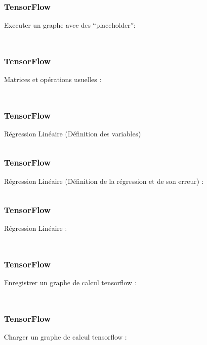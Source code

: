 \begin{frame}
  \frametitle{TensorFlow}
  Executer un graphe avec des ``placeholder'':
  \inputminted[linenos,fontsize=\small,bgcolor=pythonbg]{python}{code-illustration/tf-run_graph_placeholder.py}
  \inputminted[linenos,fontsize=\small,bgcolor=returnbg]{text}{code-illustration/tf-run_graph_placeholder.txt}
\end{frame}

\begin{frame}
  \frametitle{TensorFlow}
  Matrices et opérations usuelles :
  \inputminted[linenos,fontsize=\small,bgcolor=pythonbg]{python}{code-illustration/tf-matrices.py}
  \inputminted[linenos,fontsize=\small,bgcolor=returnbg]{text}{code-illustration/tf-matrices.txt}
\end{frame}

\begin{frame}
  \frametitle{TensorFlow}
  Régression Linéaire (Définition des variables)
  \inputminted[linenos,fontsize=\small,bgcolor=pythonbg]{python}{code-illustration/tf-regression_lineaire-0.py}
\end{frame}

\begin{frame}
  \frametitle{TensorFlow}
  Régression Linéaire (Définition de la régression et de son erreur) :
  \inputminted[linenos,fontsize=\small,bgcolor=pythonbg]{python}{code-illustration/tf-regression_lineaire-1.py}
\end{frame}

\begin{frame}
  \frametitle{TensorFlow}
  Régression Linéaire :
  \inputminted[linenos,fontsize=\small,bgcolor=pythonbg]{python}{code-illustration/tf-regression_lineaire_run.py}
  \inputminted[linenos,fontsize=\small,bgcolor=returnbg]{text}{code-illustration/tf-regression_lineaire_run.txt}
\end{frame}

\begin{frame}
  \frametitle{TensorFlow}
  Enregistrer un graphe de calcul tensorflow :
  \inputminted[linenos,fontsize=\small,bgcolor=pythonbg]{python}{code-illustration/tf-save_models.py}
  \inputminted[linenos,fontsize=\small,bgcolor=returnbg]{text}{code-illustration/tf-save_models.txt}
\end{frame}

\begin{frame}
  \frametitle{TensorFlow}
  Charger un graphe de calcul tensorflow :
  \inputminted[linenos,fontsize=\small,bgcolor=pythonbg]{python}{code-illustration/tf-load_models.py}
  \inputminted[linenos,fontsize=\small,bgcolor=returnbg]{text}{code-illustration/tf-load_models.txt}
\end{frame}

